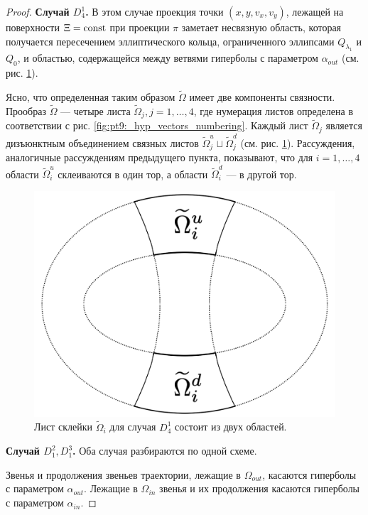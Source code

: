 \begin{proof}
\medskip
\textbf{Случай $D_4^1$.} В этом случае проекция точки $(x, y, v_x, v_y)$, лежащей на поверхности $\Xi=\mathrm{const}$ при проекции $\pi$ заметает несвязную область, которая получается пересечением эллиптического кольца, ограниченного эллипсами $Q_{\lambda_1}$ и $Q_{0}$, и областью, содержащейся между ветвями гиперболы с параметром $\alpha_{out}$  (см. рис. \ref{fig:pt9:_d41_page}). 

Ясно, что определенная таким образом $\widetilde{\Omega}$ имеет две компоненты связности. Прообраз $\widetilde{\Omega}$ --- четыре листа $\widetilde{\Omega}_j, j=1, \ldots, 4$, где нумерация листов определена в соответствии с рис. \ref{fig:pt9:_hyp_vectors_numbering}. Каждый лист $\widetilde{\Omega}_j$ является  дизъюнктным объединением связных  листов $\widetilde{\Omega}_j^u \sqcup \widetilde{\Omega}_j^d$ (см. рис. \ref{fig:pt9:_d41_page}). 
Рассуждения, аналогичные рассуждениям предыдущего пункта, показывают, что для $i=1,\ldots, 4$ области $\widetilde{\Omega}_i^u$ склеиваются в один тор, а области $\widetilde{\Omega}_i^d$ --- в другой тор.


\begin{figure}[!htb]
\centering
\includegraphics[width=0.35\linewidth]{images/ch4/section2/d41_page.pdf}
    \caption{Лист склейки  $\widetilde{\Omega}_i$  для случая $D_4^1$ состоит из двух областей.}
    \label{fig:pt9:_d41_page}
\end{figure}

\medskip
\textbf{Случай $D_1^2, D_1^3$. } 
Оба случая разбираются по одной схеме. 

Звенья и продолжения звеньев траектории, лежащие в $\Omega_{out}$, касаются гиперболы с параметром $\alpha_{out}$. Лежащие в $\Omega_{in}$ звенья и их продолжения касаются гиперболы с параметром $\alpha_{in}$.


\end{proof}

